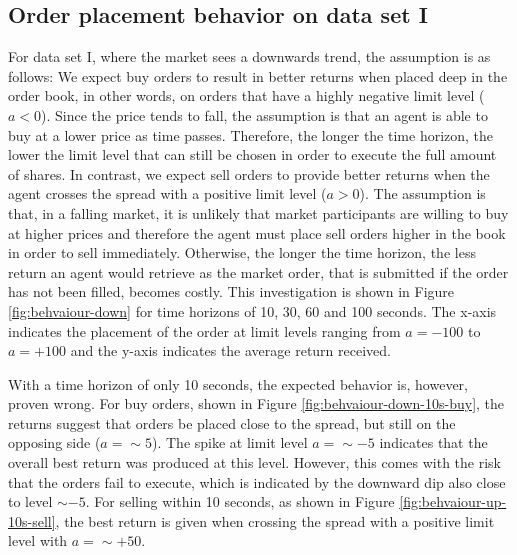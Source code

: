 \subsection{Order placement behavior on data set I}
For data set I, where the market sees a downwards trend, the assumption is as follows:
We expect buy orders to result in better returns when placed deep in the order book, in other words, on orders that have a highly negative limit level ($a<0$).
Since the price tends to fall, the assumption is that an agent is able to buy at a lower price as time passes.
Therefore, the longer the time horizon, the lower the limit level that can still be chosen in order to execute the full amount of shares.
In contrast, we expect sell orders to provide better returns when the agent crosses the spread with a positive limit level ($a>0$).
The assumption is that, in a falling market, it is unlikely that market participants are willing to buy at higher prices and therefore the agent must place sell orders higher in the book in order to sell immediately.
Otherwise, the longer the time horizon, the less return an agent would retrieve as the market order, that is submitted if the order has not been filled, becomes costly.
This investigation is shown in Figure \ref{fig:behvaiour-down} for time horizons of 10, 30, 60 and 100 seconds.
The x-axis indicates the placement of the order at limit levels ranging from $a=-100$ to $a=+100$ and the y-axis indicates the average return received.

With a time horizon of only 10 seconds, the expected behavior is, however, proven wrong.
For buy orders, shown in Figure \ref{fig:behvaiour-down-10s-buy}, the returns suggest that orders be placed close to the spread, but still on the opposing side ($a=\sim{5}$).
The spike at limit level $a=\sim{-5}$ indicates that the overall best return was produced at this level. However, this comes with the risk that the orders fail to execute, which is indicated by the downward dip also close to level $\sim{-5}$.
For selling within 10 seconds, as shown in Figure \ref{fig:behvaiour-up-10s-sell}, the best return is given when crossing the spread with a positive limit level with $a=\sim{+50}$.

